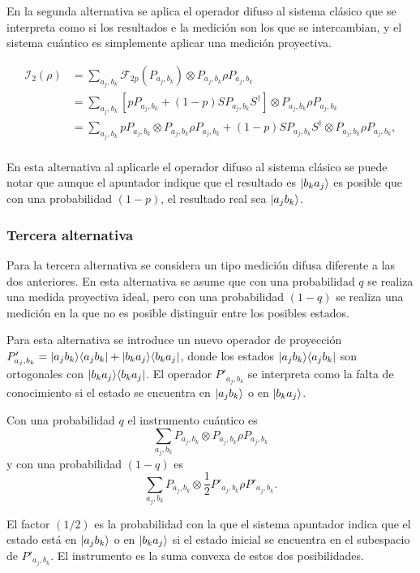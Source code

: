En la segunda alternativa se aplica el operador difuso al sistema clásico que se interpreta como si los resultados e la medición son los que se intercambian, y el sistema cuántico es simplemente aplicar una medición proyectiva.

\begin{equation}
    \begin{split}
        \mathcal{I}_2(\rho)&=\sum_{a_j,b_k}\mathcal{F}_{2p}(P_{a_j,b_k})\otimes P_{a_j,b_k} \rho P_{a_j,b_k}\\
        &=\sum_{a_j,b_k}[pP_{a_j,b_k}+(1-p)SP_{a_j,b_k}S^\dagger]\otimes P_{a_j,b_k} \rho P_{a_j,b_k}\\
        &=\sum_{a_j,b_k} pP_{a_j,b_k} \otimes P_{a_j,b_k} \rho P_{a_j,b_k}+(1-p)SP_{a_j,b_k}S^\dagger\otimes P_{a_j,b_k} \rho P_{a_j,b_k},\\
    \end{split}
\end{equation} 


En esta alternativa al aplicarle el operador difuso al sistema clásico se puede notar que aunque el apuntador indique que el resultado es $|b_k a_j\rangle$ es posible que con una probabilidad $(1-p)$, el resultado real sea $|a_j b_k\rangle$.



\subsubsection{Tercera alternativa}
Para la tercera alternativa se considera un tipo medición difusa diferente a las dos anteriores. En esta alternativa se asume que con una probabilidad $q$ se realiza una medida proyectiva ideal, pero con una probabilidad $(1-q)$ se realiza una medición en la que no es posible distinguir entre los posibles estados.

Para esta alternativa se introduce un nuevo operador de proyección $P'_{a_j,b_k}=|a_j b_k\rangle \langle a_j b_k|+|b_k a_j\rangle \langle b_k a_j|$, donde los estados $|a_j b_k\rangle \langle a_j b_k|$ son ortogonales con $|b_k a_j\rangle \langle b_k a_j|$. El operador $P'_{a_j,b_k}$ se interpreta como la falta de conocimiento si el estado se encuentra en $|a_j b_k\rangle$ o en $|b_k a_j\rangle$. 



Con una probabilidad $q$ el instrumento cuántico es \[\sum_{a_j,b_k}P_{a_j,b_k}\otimes P_{a_j,b_k}\rho P_{a_j,b_k}\] y con una probabilidad $(1-q)$ es \[\sum_{a_j,b_k} P_{a_j,b_k}\otimes \frac{1}{2} P'_{a_j,b_k}\rho P'_{a_j,b_k}.\]

El factor $(1/2)$ es la probabilidad con la que el sistema apuntador indica  que el estado está en $|a_j b_k\rangle $ o en $|b_k a_j\rangle$ si el estado inicial se encuentra en el subespacio de $P'_{a_j,b_k}$. El instrumento es la suma convexa de estos dos posibilidades.

